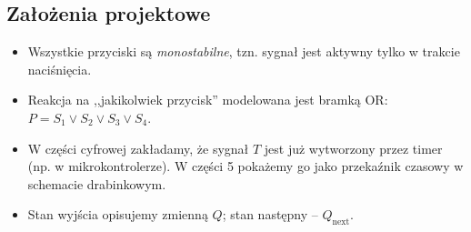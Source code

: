 \subsection{Założenia projektowe}
\begin{itemize}
    \item Wszystkie przyciski są \emph{monostabilne}, tzn. sygnał jest
          aktywny tylko w trakcie naciśnięcia.
    \item Reakcja na ,,jakikolwiek przycisk'' modelowana jest bramką OR:
          $P = S_1 \lor S_2 \lor S_3 \lor S_4$.
    \item W części cyfrowej zakładamy, że sygnał $T$ jest już wytworzony
          przez timer (np. w mikrokontrolerze). W części 5 pokażemy go
          jako przekaźnik czasowy w schemacie drabinkowym.
    \item Stan wyjścia opisujemy zmienną $Q$; stan następny – $Q_{\text{next}}$.
\end{itemize}
